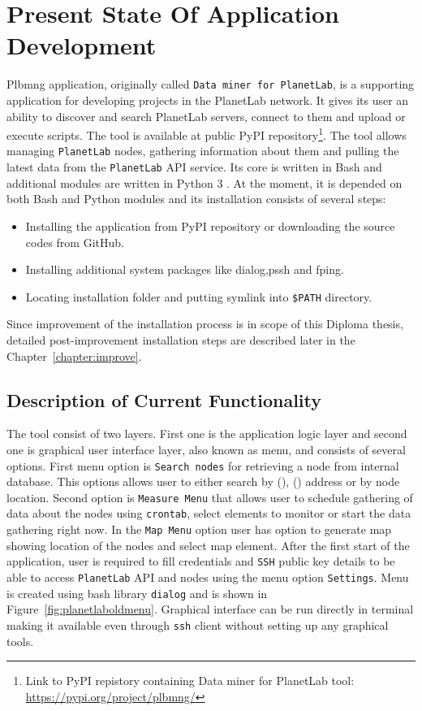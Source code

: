 \chapter{Present State Of Application Development}
\label{chapter:plbmng}
Plbmng application, originally called \texttt{Data miner for PlanetLab}, is a supporting application for developing projects in the PlanetLab network. It gives its user an ability to discover and search PlanetLab servers, connect to them and upload or execute scripts. The tool is available at public PyPI repository\footnote{Link to PyPI repistory containing Data miner for PlanetLab tool: \url{https://pypi.org/project/plbmng/}}. The tool allows managing \texttt{PlanetLab} nodes, gathering information about them and pulling the latest data from the \texttt{PlanetLab} API service. Its core is written in Bash and additional modules are written in Python 3 \cite{suba1}. At the moment, it is depended on both Bash and Python modules and its installation consists of several steps:
\begin{itemize}
	\item Installing the application from PyPI repository or downloading the source codes from GitHub.
	\item Installing additional system packages like dialog,pssh and fping.
	\item Locating installation folder and putting symlink into \texttt{\$PATH} directory.
\end{itemize}
Since improvement of the installation process is in scope of this Diploma thesis, detailed post-improvement installation steps are described later in the Chapter~\ref{chapter:improve}.
\section{Description of Current Functionality}
The tool consist of two layers. First one is the application logic layer and second one is graphical user interface layer, also known as menu, and consists of several options. First menu option is \texttt{Search nodes} for retrieving a node from internal database. This options allows user to either search by  (),  () address or by node location. Second option is \texttt{Measure Menu} that allows user to schedule gathering of data about the nodes using \texttt{crontab}, select elements to monitor or start the data gathering right now. In the \texttt{Map Menu} option user has option to generate map showing location of the nodes and select map element. After the first start of the application, user is required to fill credentials and \texttt{SSH} public key details to be able to access \texttt{PlanetLab} API and nodes using the menu option \texttt{Settings}. Menu is created using bash library \texttt{dialog} and is shown in Figure~\ref{fig:planetlaboldmenu}. Graphical interface can be run directly in terminal making it available even through \texttt{ssh} client without setting up any graphical tools.

